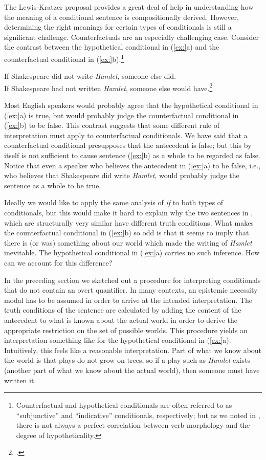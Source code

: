 The Lewis-Kratzer proposal provides a great deal of help in understanding how the meaning of a conditional sentence is compositionally derived. However, determining the right meanings for certain types of conditionals is still a significant challenge. Counterfactuals are an especially challenging case. Consider the contrast between the hypothetical conditional in (\ref{ex:}a) and the counterfactual conditional in (\ref{ex:}b).\footnote{Counterfactual and hypothetical conditionals are often referred to as “subjunctive” and “indicative” conditionals, respectively; but as we noted in , there is not always a perfect correlation between verb morphology and the degree of hypotheticality.}


\ea
\ea If Shakespeare did not write \textit{Hamlet}, someone else did.\\
\ex If Shakespeare had not written \textit{Hamlet}, someone else would have.\footnote{\citet{Morton2004}.}
                       \z
\z


Most English speakers would probably agree that the hypothetical conditional in (\ref{ex:}a) is true, but would probably judge the counterfactual conditional in (\ref{ex:}b) to be false. This contrast suggests that some different rule of interpretation must apply to counterfactual conditionals. We have said that a counterfactual conditional presupposes that the antecedent is false; but this by itself is not sufficient to cause sentence (\ref{ex:}b) as a whole to be regarded as false. Notice that even a speaker who believes the antecedent in (\ref{ex:}a) to be false, i.e., who believes that Shakespeare did write \textit{Hamlet}, would probably judge the sentence as a whole to be true.



Ideally we would like to apply the same analysis of \textit{if} to both types of conditionals, but this would make it hard to explain why the two sentences in , which are structurally very similar have different truth conditions. What makes the counterfactual conditional in (\ref{ex:}b) so odd is that it seems to imply that there is (or was) something about our world which made the writing of \textit{Hamlet} inevitable. The hypothetical conditional in (\ref{ex:}a) carries no such inference. How can we account for this difference?



In the preceding section we sketched out a procedure for interpreting conditionals that do not contain an overt quantifier. In many contexts, an epistemic necessity modal has to be assumed in order to arrive at the intended interpretation. The truth conditions of the sentence are calculated by adding the content of the antecedent to what is known about the actual world in order to derive the appropriate restriction on the set of possible worlds. This procedure yields an interpretation something like  for the hypothetical conditional in (\ref{ex:}a). Intuitively, this feels like a reasonable interpretation. Part of what we know about the world is that plays do not grow on trees, so if a play such as \textit{Hamlet} exists (another part of what we know about the actual world), then someone must have written it.


